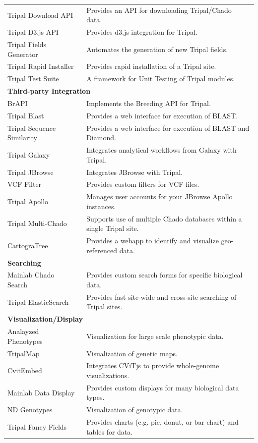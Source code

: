 \begin{table}[!ht]
\begin{tabularx}{\linewidth}{ll}
		Tripal Download API  & Provides an API for downloading Tripal/Chado data.  \\
		Tripal D3.js API  & Provides d3.js integration for Tripal.  \\
		Tripal Fields Generator  & Automates the generation of new Tripal fields.  \\
		Tripal Rapid Installer  & Provides rapid installation of a Tripal site.  \\
		Tripal Test Suite  & A framework for Unit Testing of Tripal modules.  \\
		\multicolumn{2}{l}{\textbf{Third-party Integration }} \\
		BrAPI  & Implements the Breeding API for Tripal.  \\
		Tripal Blast  & Provides a web interface for execution of BLAST.  \\
		Tripal Sequence Similarity  & Provides a web interface for execution of BLAST and Diamond.  \\
		Tripal Galaxy  & Integrates analytical workflows from Galaxy with Tripal.  \\
		Tripal JBrowse  & Integrates JBrowse with Tripal.  \\
		VCF Filter  & Provides custom filters for VCF files.  \\
		Tripal Apollo  & Manages user accounts for your JBrowse Apollo instances.  \\
		Tripal Multi-Chado  & Supports use of multiple Chado databases within a single Tripal site.  \\
		CartograTree  & Provides a webapp to identify and visualize geo-referenced data.  \\
		\multicolumn{2}{l}{\textbf{Searching }} \\
		Mainlab Chado Search  & Provides custom search forms for specific biological data.  \\
		Tripal ElasticSearch  & Provides fast site-wide and cross-site searching of Tripal sites.  \\
		\multicolumn{2}{l}{\textbf{Visualization/Display }} \\
		Analayzed Phenotypes  & Visualization for large scale phenotypic data.  \\
		TripalMap  & Visualization of genetic maps.  \\
		CvitEmbed  & Integrates CViTjs to provide whole-genome visualizations.  \\
		Mainlab Data Display  & Provides custom displays for many biological data types.  \\
		ND Genotypes  & Visualization of genotypic data.  \\
		Tripal Fancy Fields  & Provides charts (e.g. pie, donut, or bar chart) and tables for data.  \\
	\end{tabularx}
\end{table}
\normalsize


